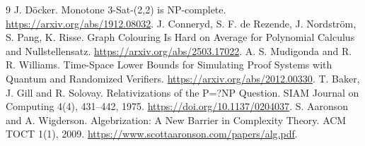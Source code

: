\documentclass[11pt]{article}
\begin{document}
\begin{thebibliography}{9}
 J. D\"ocker. Monotone 3-Sat-(2,2) is NP-complete.
\url{https://arxiv.org/abs/1912.08032}.
 J. Conneryd, S. F. de Rezende, J. Nordstr\"om, S. Pang,
K. Risse. Graph Colouring Is Hard on Average for Polynomial Calculus and
Nullstellensatz. \url{https://arxiv.org/abs/2503.17022}.
 A. S. Mudigonda and R. R. Williams. Time-Space Lower Bounds for
Simulating Proof Systems with Quantum and Randomized Verifiers.
\url{https://arxiv.org/abs/2012.00330}.
 T. Baker, J. Gill and R. Solovay. Relativizations of the
P=?NP Question. SIAM Journal on Computing 4(4), 431--442, 1975.
\url{https://doi.org/10.1137/0204037}.
 S. Aaronson and A. Wigderson. Algebrization: A New Barrier in
Complexity Theory. ACM TOCT 1(1), 2009.
\url{https://www.scottaaronson.com/papers/alg.pdf}.
\end{thebibliography}
\end{document}
